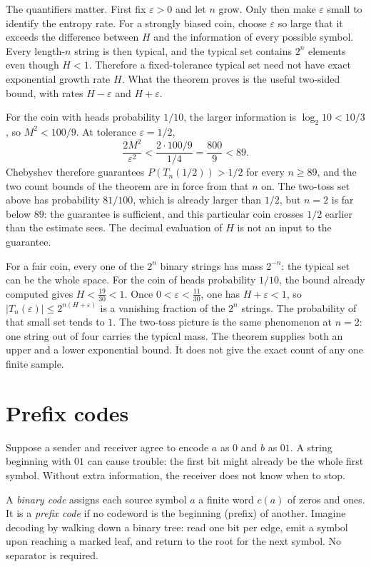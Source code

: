 The quantifiers matter. First fix $\varepsilon>0$ and let $n$ grow. Only then make $\varepsilon$ small to identify the entropy rate. For a strongly biased coin, choose $\varepsilon$ so large that it exceeds the difference between $H$ and the information of every possible symbol. Every length-$n$ string is then typical, and the typical set contains $2^n$ elements even though $H<1$. Therefore a fixed-tolerance typical set need not have exact exponential growth rate $H$. What the theorem proves is the useful two-sided bound, with rates $H-\varepsilon$ and $H+\varepsilon$.

For the coin with heads probability $1/10$, the larger information is $\log_2 10<10/3$, so $M^2<100/9$. At tolerance $\varepsilon=1/2$,
\[
 \frac{2M^2}{\varepsilon^2}<\frac{2\cdot 100/9}{1/4}=\frac{800}9<89.
\]
Chebyshev therefore guarantees $P(T_n(1/2))>1/2$ for every $n\ge 89$, and the two count bounds of the theorem are in force from that $n$ on. The two-toss set above has probability $81/100$, which is already larger than $1/2$, but $n=2$ is far below $89$: the guarantee is sufficient, and this particular coin crosses $1/2$ earlier than the estimate sees. The decimal evaluation of $H$ is not an input to the guarantee.

For a fair coin, every one of the $2^n$ binary strings has mass $2^{-n}$: the typical set can be the whole space. For the coin of heads probability $1/10$, the bound already computed gives $H<\tfrac{19}{30}<1$. Once $0<\varepsilon<\tfrac{11}{30}$, one has $H+\varepsilon<1$, so $|T_n(\varepsilon)|\le 2^{n(H+\varepsilon)}$ is a vanishing fraction of the $2^n$ strings. The probability of that small set tends to $1$. The two-toss picture is the same phenomenon at $n=2$: one string out of four carries the typical mass. The theorem supplies both an upper and a lower exponential bound. It does not give the exact count of any one finite sample.

\section{Prefix codes}

Suppose a sender and receiver agree to encode $a$ as $0$ and $b$ as $01$. A string beginning with $01$ can cause trouble: the first bit might already be the whole first symbol. Without extra information, the receiver does not know when to stop.

A \emph{binary code} assigns each source symbol $a$ a finite word $c(a)$ of zeros and ones. It is a \emph{prefix code} if no codeword is the beginning (prefix) of another. Imagine decoding by walking down a binary tree: read one bit per edge, emit a symbol upon reaching a marked leaf, and return to the root for the next symbol. No separator is required.


